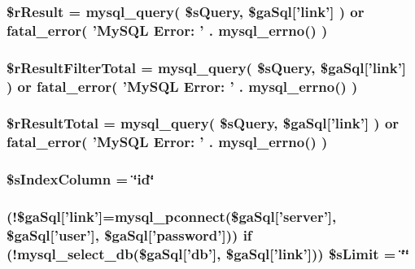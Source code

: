 \hypertarget{id_8php_a8f423fcb1764890d70da997a4140f703}{
\subsubsection[{\$r\+Result}]{\setlength{\rightskip}{0pt plus 5cm}\$r\+Result = mysql\+\_\+query( \$s\+Query, \$ga\+Sql\mbox{[}'link'\mbox{]} ) or {\bf fatal\+\_\+error}( 'My\+S\+Q\+L Error\+: ' . mysql\+\_\+errno() )}}\label{id_8php_a8f423fcb1764890d70da997a4140f703}
\hypertarget{id_8php_a29b3b8a9782e4c5b8157be2ba70a33e1}{
\subsubsection[{\$r\+Result\+Filter\+Total}]{\setlength{\rightskip}{0pt plus 5cm}\$r\+Result\+Filter\+Total = mysql\+\_\+query( \$s\+Query, \$ga\+Sql\mbox{[}'link'\mbox{]} ) or {\bf fatal\+\_\+error}( 'My\+S\+Q\+L Error\+: ' . mysql\+\_\+errno() )}}\label{id_8php_a29b3b8a9782e4c5b8157be2ba70a33e1}
\hypertarget{id_8php_a48722b6bbefe9d4cb748bf0c3f936272}{
\subsubsection[{\$r\+Result\+Total}]{\setlength{\rightskip}{0pt plus 5cm}\$r\+Result\+Total = mysql\+\_\+query( \$s\+Query, \$ga\+Sql\mbox{[}'link'\mbox{]} ) or {\bf fatal\+\_\+error}( 'My\+S\+Q\+L Error\+: ' . mysql\+\_\+errno() )}}\label{id_8php_a48722b6bbefe9d4cb748bf0c3f936272}
\hypertarget{id_8php_a8bddf0b8ded9777b9068de5fa9e217a2}{
\subsubsection[{\$s\+Index\+Column}]{\setlength{\rightskip}{0pt plus 5cm}\$s\+Index\+Column = \char`\"{}id\char`\"{}}}\label{id_8php_a8bddf0b8ded9777b9068de5fa9e217a2}
\hypertarget{id_8php_a867f070c3b4e597275c622aac60de587}{
\subsubsection[{\$s\+Limit}]{ (!\$ga\+Sql\mbox{[}'link'\mbox{]}=mysql\+\_\+pconnect(\$ga\+Sql\mbox{[}'server'\mbox{]}, \$ga\+Sql\mbox{[}'user'\mbox{]}, \$ga\+Sql\mbox{[}'password'\mbox{]})) {\bf if} (!mysql\+\_\+select\+\_\+db(\$ga\+Sql\mbox{[}'db'\mbox{]}, \$ga\+Sql\mbox{[}'link'\mbox{]})) \$s\+Limit = \char`\"{}\char`\"{}}}\label{id_8php_a867f070c3b4e597275c622aac60de587}
